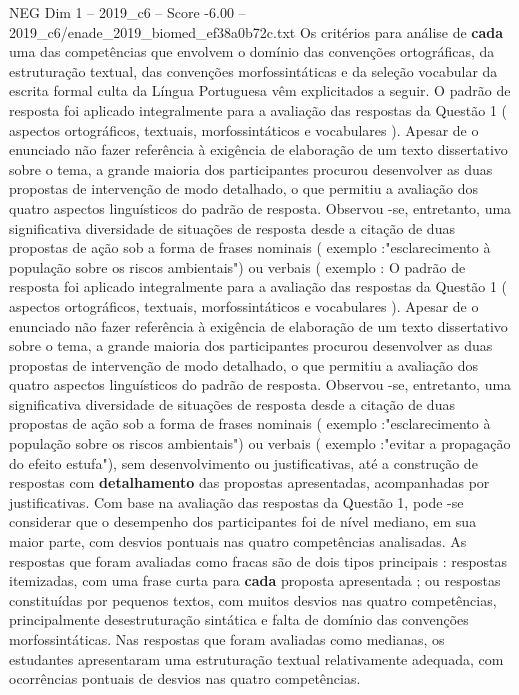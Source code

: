 \begin{textsample}{NEG Dim 1 – 2019\_c6 – Score -6.00 – 2019\_c6/enade\_2019\_biomed\_ef38a0b72c.txt}
Os critérios para análise de \textbf{cada} uma das competências que envolvem o domínio das convenções ortográficas, da estruturação textual, das convenções morfossintáticas e da seleção vocabular da escrita formal culta da Língua Portuguesa vêm explicitados a seguir.
O padrão de resposta foi aplicado integralmente para a avaliação das respostas da Questão 1 ( aspectos ortográficos, textuais, morfossintáticos e vocabulares ).
Apesar de o enunciado não fazer referência à exigência de elaboração de um texto dissertativo sobre o tema, a grande maioria dos participantes procurou desenvolver as duas propostas de intervenção de modo detalhado, o que permitiu a avaliação dos quatro aspectos linguísticos do padrão de resposta.
Observou -se, entretanto, uma significativa diversidade de situações de resposta desde a citação de duas propostas de ação sob a forma de frases nominais ( exemplo :"esclarecimento à população sobre os riscos ambientais") ou verbais ( exemplo : O padrão de resposta foi aplicado integralmente para a avaliação das respostas da Questão 1 ( aspectos ortográficos, textuais, morfossintáticos e vocabulares ).
Apesar de o enunciado não fazer referência à exigência de elaboração de um texto dissertativo sobre o tema, a grande maioria dos participantes procurou desenvolver as duas propostas de intervenção de modo detalhado, o que permitiu a avaliação dos quatro aspectos linguísticos do padrão de resposta.
Observou -se, entretanto, uma significativa diversidade de situações de resposta desde a citação de duas propostas de ação sob a forma de frases nominais ( exemplo :"esclarecimento à população sobre os riscos ambientais") ou verbais ( exemplo :"evitar a propagação do efeito estufa"), sem desenvolvimento ou justificativas, até a construção de respostas com \textbf{detalhamento} das propostas apresentadas, acompanhadas por justificativas.
Com base na avaliação das respostas da Questão 1, pode -se considerar que o desempenho dos participantes foi de nível mediano, em sua maior parte, com desvios pontuais nas quatro competências analisadas.
As respostas que foram avaliadas como fracas são de dois tipos principais : respostas itemizadas, com uma frase curta para \textbf{cada} proposta apresentada ; ou respostas constituídas por pequenos textos, com muitos desvios nas quatro competências, principalmente desestruturação sintática e falta de domínio das convenções morfossintáticas.
Nas respostas que foram avaliadas como medianas, os estudantes apresentaram uma estruturação textual relativamente adequada, com ocorrências pontuais de desvios nas quatro competências.

\end{textsample}
